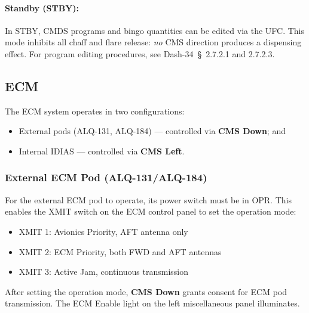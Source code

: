 \documentclass[11pt, a4paper, twoside]{report}
\newcommand{\dashref}[1]{Dash-34~\S~#1}
\begin{document}
\paragraph{Standby (STBY):}
In STBY, CMDS programs and bingo quantities can be edited via the UFC. This mode inhibits all chaff and flare release: \textit{no} CMS direction produces a dispensing effect.
For program editing procedures, see \dashref{2.7.2.1 and 2.7.2.3}.

\subsection{ECM}
\label{sec:C5-S2-S2}

The ECM system operates in two configurations:

\begin{itemize}
  \item External pods (ALQ-131, ALQ-184) --- controlled via \textbf{CMS Down}; and
  \item Internal IDIAS --- controlled via \textbf{CMS Left}.
\end{itemize}

\subsubsection{External ECM Pod (ALQ-131/ALQ-184)}
\label{sec:C5-S2-S2-S1}

For the external ECM pod to operate, its power switch must be in OPR. This enables the XMIT switch on the ECM control panel to set the operation mode:

\begin{itemize}
  \item XMIT 1: Avionics Priority, AFT antenna only
  \item XMIT 2: ECM Priority, both FWD and AFT antennas
  \item XMIT 3: Active Jam, continuous transmission
\end{itemize}

After setting the operation mode, \textbf{CMS Down} grants consent for ECM pod transmission. The ECM Enable light on the left miscellaneous panel illuminates.
\end{document}
